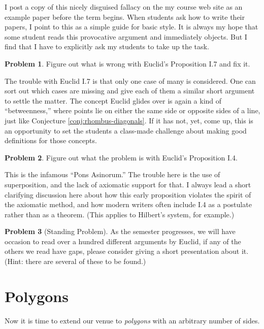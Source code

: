 \documentclass{tufte-handout}
\theoremstyle{definition}
\newtheorem{problem}{Problem}[section]
\begin{document}
I post a copy of this nicely disguised fallacy on the my course web site as an example paper before the term begins. When students ask how to write their papers, I point to this as a simple guide for basic style. It is always my hope that some student reads this provocative argument and immediately objects. But I find that I have to explicitly ask my students to take up the task. 

\begin{problem}\label{prob:fix-I.7}
Figure out what is wrong with Euclid's Proposition I.7 and fix it.
\end{problem}

The trouble with Euclid I.7 is that only one case of many is considered. One can sort out which cases are missing and give each of them a similar short argument to settle the matter. The concept Euclid glides over is again a kind of ``betweenness,'' where points lie on either the same side or opposite sides of a line, just like Conjecture \ref{conj:rhombus-diagonals}. If it has not, yet, come up, this is an opportunity to set the students a class-made challenge about making good definitions for those concepts. 

\begin{problem}\label{prob:fix-I.4}
Figure out what the problem is with Euclid's Proposition I.4.
\end{problem}

This is the infamous ``Pons Asinorum.'' The trouble here is the use of superposition, and the lack of axiomatic support for that. I always lead a short clarifying discussion here about how this early proposition violates the spirit of the axiomatic method, and how modern writers often include I.4 as a postulate rather than as a theorem. (This applies to Hilbert's system, for example.)

\begin{problem}[Standing Problem]
As the semester progresses, we will have occasion to read over a hundred different arguments by Euclid, if any of the others we read have gaps, please consider giving a short presentation about it.
(Hint: there are several of these to be found.)
\end{problem}


\clearpage
\setcounter{section}{5}
\setcounter{problem}{0}
\section{Polygons}
Now it is time to extend our venue to \emph{polygons} with an arbitrary number of sides.
\end{document}
